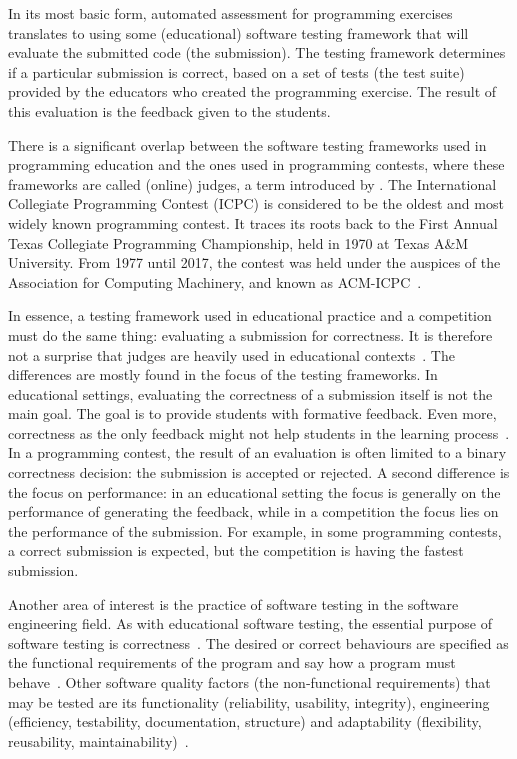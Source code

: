 \documentclass[../main]{subfiles}
\begin{document}
In its most basic form, automated assessment for programming exercises translates to using some (educational) software testing framework that will evaluate the submitted code (the submission).
The testing framework determines if a particular submission is correct, based on a set of tests (the test suite) provided by the educators who created the programming exercise.
The result of this evaluation is the feedback given to the students.

There is a significant overlap between the software testing frameworks used in programming education and the ones used in programming contests, where these frameworks are called (online) judges, a term introduced by \textcite{kurniaOnlineJudge2001}.
The International Collegiate Programming Contest (ICPC) is considered to be the oldest and most widely known programming contest.
It traces its roots back to the First Annual Texas Collegiate Programming Championship, held in 1970 at Texas A\&M University.
From 1977 until 2017, the contest was held under the auspices of the Association for Computing Machinery, and known as ACM-ICPC~\autocite{ICPCFactSheet2023}.

In essence, a testing framework used in educational practice and a competition must do the same thing: evaluating a submission for correctness.
It is therefore not a surprise that judges are heavily used in educational contexts~\autocite{wasikSurveyOnlineJudge2018,zinovievaUseOnlineCoding2021,liuWhoJudgesJudge2023}.
The differences are mostly found in the focus of the testing frameworks.
In educational settings, evaluating the correctness of a submission itself is not the main goal.
The goal is to provide students with formative feedback.
Even more, correctness as the only feedback might not help students in the learning process~\autocite{haoUnderstandingEffectiveDesign2021}.
In a programming contest, the result of an evaluation is often limited to a binary correctness decision: the submission is accepted or rejected.
A second difference is the focus on performance: in an educational setting the focus is generally on the performance of generating the feedback, while in a competition the focus lies on the performance of the submission.
For example, in some programming contests, a correct submission is expected, but the competition is having the fastest submission.

Another area of interest is the practice of software testing in the software engineering field.
As with educational software testing, the essential purpose of software testing is correctness~\autocite{panSoftwareTesting1999}.
The desired or correct behaviours are specified as the functional requirements of the program and say how a program must behave~\autocite{bassSoftwareArchitecturePractice2021}.
Other software quality factors (the non‐functional requirements) that may be tested are its functionality (reliability, usability, integrity), engineering (efficiency, testability, documentation, structure) and adaptability (flexibility, reusability, maintainability)~\autocite{hetzelCompleteGuideSoftware1988}.
\end{document}
